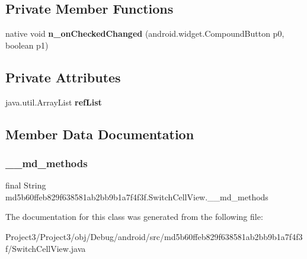 \subsection*{Private Member Functions}
\begin{DoxyCompactItemize}
\item 
\mbox{\label{classmd5b60ffeb829f638581ab2bb9b1a7f4f3f_1_1SwitchCellView_a2b93ae01c4c3137f968f18538c1858d8}} 
native void {\bfseries n\+\_\+on\+Checked\+Changed} (android.\+widget.\+Compound\+Button p0, boolean p1)
\end{DoxyCompactItemize}
\subsection*{Private Attributes}
\begin{DoxyCompactItemize}
\item 
\mbox{\label{classmd5b60ffeb829f638581ab2bb9b1a7f4f3f_1_1SwitchCellView_a66bff703a87b9110a0b7ec44c8abfffb}} 
java.\+util.\+Array\+List {\bfseries ref\+List}
\end{DoxyCompactItemize}


\subsection{Member Data Documentation}
\mbox{\label{classmd5b60ffeb829f638581ab2bb9b1a7f4f3f_1_1SwitchCellView_a1153176f1114dedfcdc6c831e33adfea}} 
\subsubsection{\texorpdfstring{\+\_\+\+\_\+md\+\_\+methods}{\_\_md\_methods}}
{\footnotesize\ttfamily final String md5b60ffeb829f638581ab2bb9b1a7f4f3f.\+Switch\+Cell\+View.\+\_\+\+\_\+md\+\_\+methods\hspace{0.3cm}{\ttfamily [static]}}



The documentation for this class was generated from the following file\+:\begin{DoxyCompactItemize}
\item 
Project3/\+Project3/obj/\+Debug/android/src/md5b60ffeb829f638581ab2bb9b1a7f4f3f/Switch\+Cell\+View.\+java\end{DoxyCompactItemize}
